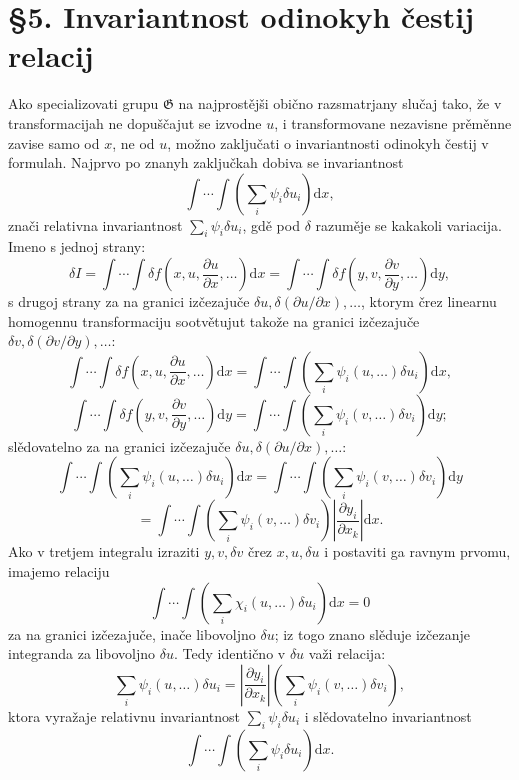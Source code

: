 \documentclass[11pt]{article}
\providecommand{\G}{\mathfrak G}
\providecommand{\p}{\partial}
\providecommand{\dd}{\mathrm d}
\begin{document}
\section*{\S{}5. Invariantnost odinokyh čestij relacij}

Ako specializovati grupu \(\G\) na najprostějši obično razsmatrjany slučaj tako, že v transformacijah ne dopuščajut se izvodne \(u\), i transformovane nezavisne prěměnne zavise samo od \(x\), ne od \(u\), možno zaključati o invariantnosti odinokyh čestij v formulah. Najprvo po znanyh zaključkah dobiva se invariantnost
\[
\int\!\cdots\!\int\left(\sum_i\psi_i\delta u_i\right)\dd x,
\]
znači relativna invariantnost \(\sum_i\psi_i\delta u_i\), gdě pod \(\delta\) razuměje se kakakoli variacija. Imeno s jednoj strany:
\[
\delta I
=\int\!\cdots\!\int \delta f\!\left(x,u,\frac{\p u}{\p x},\ldots\right)\dd x
=\int\!\cdots\!\int \delta f\!\left(y,v,\frac{\p v}{\p y},\ldots\right)\dd y,
\]
s drugoj strany za na granici izčezajuče \(\delta u,\delta(\p u/\p x),\ldots\), ktorym črez linearnu homogennu transformaciju sootvětujut takože na granici izčezajuče \(\delta v,\delta(\p v/\p y),\ldots\):
\[
\int\!\cdots\!\int \delta f\!\left(x,u,\frac{\p u}{\p x},\ldots\right)\dd x
=
\int\!\cdots\!\int\left(\sum_i\psi_i(u,\ldots)\delta u_i\right)\dd x,
\]
\[
\int\!\cdots\!\int \delta f\!\left(y,v,\frac{\p v}{\p y},\ldots\right)\dd y
=
\int\!\cdots\!\int\left(\sum_i\psi_i(v,\ldots)\delta v_i\right)\dd y;
\]
slědovatelno za na granici izčezajuče \(\delta u,\delta(\p u/\p x),\ldots\):
\[
\int\!\cdots\!\int\left(\sum_i\psi_i(u,\ldots)\delta u_i\right)\dd x
=
\int\!\cdots\!\int\left(\sum_i\psi_i(v,\ldots)\delta v_i\right)\dd y
\]
\[
=
\int\!\cdots\!\int\left(\sum_i\psi_i(v,\ldots)\delta v_i\right)
\left|\frac{\p y_i}{\p x_k}\right|\dd x.
\]
Ako v tretjem integralu izraziti \(y,v,\delta v\) črez \(x,u,\delta u\) i postaviti ga ravnym prvomu, imajemo relaciju
\[
\int\!\cdots\!\int\left(\sum_i\chi_i(u,\ldots)\delta u_i\right)\dd x=0
\]
za na granici izčezajuče, inače libovoljno \(\delta u\); iz togo znano slěduje izčezanje integranda za libovoljno \(\delta u\). Tedy identično v \(\delta u\) važi relacija:
\[
\sum_i\psi_i(u,\ldots)\delta u_i
=
\left|\frac{\p y_i}{\p x_k}\right|
\left(\sum_i\psi_i(v,\ldots)\delta v_i\right),
\]
ktora vyražaje relativnu invariantnost \(\sum_i\psi_i\delta u_i\) i slědovatelno invariantnost
\[
\int\!\cdots\!\int\left(\sum_i\psi_i\delta u_i\right)\dd x.
\]
\end{document}
